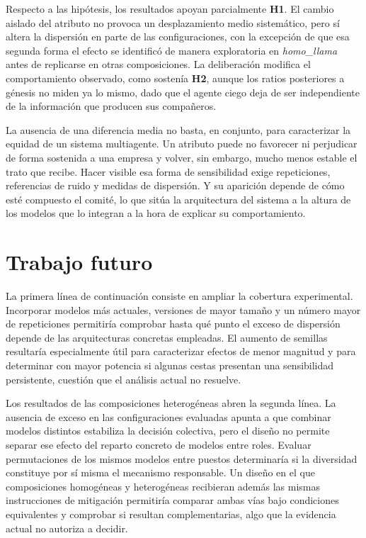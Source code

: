 Respecto a las hipótesis, los resultados apoyan parcialmente \textbf{H1}. El cambio aislado del atributo no provoca un desplazamiento medio sistemático, pero sí altera la dispersión en parte de las configuraciones, con la excepción de que esa segunda forma el efecto se identificó de manera exploratoria en \textit{homo\_llama} antes de replicarse en otras composiciones. La deliberación modifica el comportamiento observado, como sostenía \textbf{H2}, aunque los ratios posteriores a génesis no miden ya lo mismo, dado que el agente ciego deja de ser independiente de la información que producen sus compañeros.

La ausencia de una diferencia media no basta, en conjunto, para caracterizar la equidad de un sistema multiagente. Un atributo puede no favorecer ni perjudicar de forma sostenida a una empresa y volver, sin embargo, mucho menos estable el trato que recibe. Hacer visible esa forma de sensibilidad exige repeticiones, referencias de ruido y medidas de dispersión. Y su aparición depende de cómo esté compuesto el comité, lo que sitúa la arquitectura del sistema a la altura de los modelos que lo integran a la hora de explicar su comportamiento.

\section{Trabajo futuro}
\label{sec:trabajo_futuro}

La primera línea de continuación consiste en ampliar la cobertura experimental. Incorporar modelos más actuales, versiones de mayor tamaño y un número mayor de repeticiones permitiría comprobar hasta qué punto el exceso de dispersión depende de las arquitecturas concretas empleadas. El aumento de semillas resultaría especialmente útil para caracterizar efectos de menor magnitud y para determinar con mayor potencia si algunas cestas presentan una sensibilidad persistente, cuestión que el análisis actual no resuelve.

Los resultados de las composiciones heterogéneas abren la segunda línea. La ausencia de exceso en las configuraciones evaluadas apunta a que combinar modelos distintos estabiliza la decisión colectiva, pero el diseño no permite separar ese efecto del reparto concreto de modelos entre roles. Evaluar permutaciones de los mismos modelos entre puestos determinaría si la diversidad constituye por sí misma el mecanismo responsable. Un diseño en el que composiciones homogéneas y heterogéneas recibieran además las mismas instrucciones de mitigación permitiría comparar ambas vías bajo condiciones equivalentes y comprobar si resultan complementarias, algo que la evidencia actual no autoriza a decidir.

